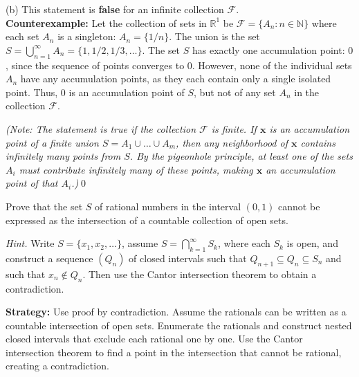 (b) This statement is \textbf{false} for an infinite collection $\mathcal{F}$.\\
\textbf{Counterexample:} Let the collection of sets in $\mathbb{R}^1$ be $\mathcal{F} = \{A_n : n \in \mathbb{N}\}$ where each set $A_n$ is a singleton: $A_n = \{1/n\}$.
The union is the set $S = \bigcup_{n=1}^{\infty} A_n = \{1, 1/2, 1/3, \dots\}$.
The set $S$ has exactly one accumulation point: $0$, since the sequence of points converges to $0$.
However, none of the individual sets $A_n$ have any accumulation points, as they each contain only a single isolated point.
Thus, $0$ is an accumulation point of $S$, but not of any set $A_n$ in the collection $\mathcal{F}$.

\textit{(Note: The statement is true if the collection $\mathcal{F}$ is finite. If $\mathbf{x}$ is an accumulation point of a finite union $S = A_1 \cup \dots \cup A_m$, then any neighborhood of $\mathbf{x}$ contains infinitely many points from $S$. By the pigeonhole principle, at least one of the sets $A_i$ must contribute infinitely many of these points, making $\mathbf{x}$ an accumulation point of that $A_i$.)}\qed


\begin{problembox}
Prove that the set \( S \) of rational numbers in the interval \( (0, 1) \) cannot be expressed as the intersection of a countable collection of open sets. 

\textit{Hint.} Write \( S = \{x_1, x_2, \ldots\} \), assume \( S = \bigcap_{k=1}^{\infty} S_k \), where each \( S_k \) is open, and construct a sequence \( (Q_n) \) of closed intervals such that \( Q_{n+1} \subseteq Q_n \subseteq S_n \) and such that \( x_n \notin Q_n \). Then use the Cantor intersection theorem to obtain a contradiction.
\end{problembox}

\noindent\textbf{Strategy:} Use proof by contradiction. Assume the rationals can be written as a countable intersection of open sets. Enumerate the rationals and construct nested closed intervals that exclude each rational one by one. Use the Cantor intersection theorem to find a point in the intersection that cannot be rational, creating a contradiction.

